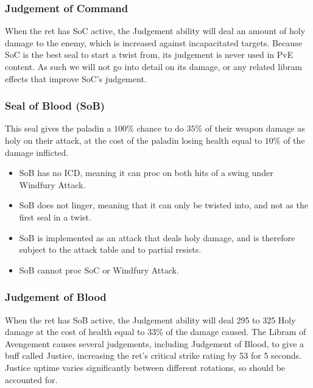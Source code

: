 \documentclass[letterpaper,11pt]{article}
\begin{document}
	\subsubsection{Judgement of Command}
	When the ret has SoC active, the Judgement ability will deal an amount of holy damage to the enemy, which is increased against incapacitated targets.
	Because SoC is the best seal to start a twist from, its judgement is never used in PvE content.
	As such we will not go into detail on its damage, or any related libram effects that improve SoC's judgement.
	
	\subsubsection{Seal of Blood (SoB)}
	\label{sec:sob}
 	This seal gives the paladin a $100 \%$ chance to do $35 \%$ of their weapon damage as holy on their attack, at the cost of the paladin losing health equal to $10 \%$ of the damage inflicted.
	\begin{itemize}
		\item SoB has no ICD, meaning it can proc on both hits of a swing under Windfury Attack.
		\item SoB does not linger, meaning that it can only be twisted into, and not as the first seal in a twist.
		\item SoB is implemented as an attack that deals holy damage, and is therefore subject to the attack table and to partial resists.
		\item SoB cannot proc SoC or Windfury Attack.
	\end{itemize}
 	
	\subsubsection{Judgement of Blood}
	When the ret has SoB active, the Judgement ability will deal 295 to 325 Holy damage at the cost of health equal to $33 \%$ of the damage caused.
	The Libram of Avengement causes several judgements, including Judgement of Blood, to give a buff called Justice, increasing the ret's critical strike rating by 53 for 5 seconds.
	Justice uptime varies significantly between different rotations, so should be accounted for.
	
\end{document}
